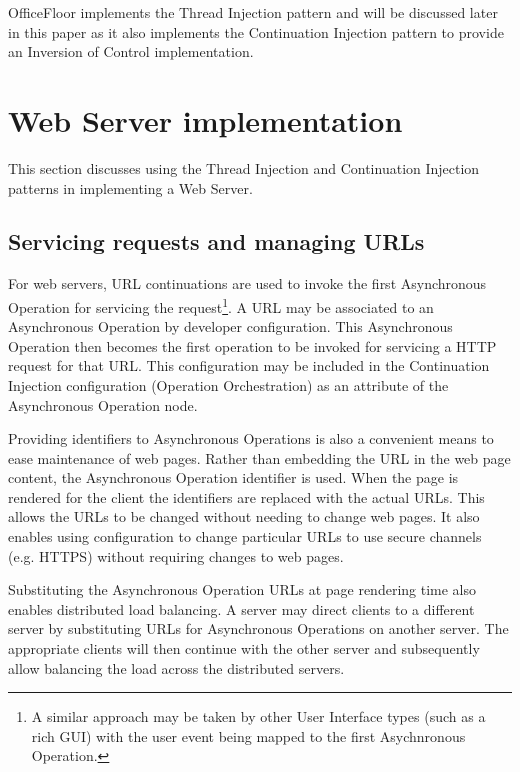 \documentclass[prodmode]{style/acmlarge}
\begin{document}
OfficeFloor \cite{officefloor} implements the Thread Injection pattern and will
be discussed later in this paper as it also implements the Continuation
Injection pattern to provide an Inversion of Control implementation.




\section{Web Server implementation}

This section discusses using the Thread Injection and Continuation Injection
patterns in implementing a Web Server.


\subsection{Servicing requests and managing URLs}

For web servers, URL continuations \cite{url-continuation} are used to invoke
the first Asynchronous Operation for servicing the request\footnote{A similar
approach may be taken by other User Interface types (such as a rich GUI) with
the user event being mapped to the first Asychnronous Operation.}.  A URL may be
associated to an Asynchronous Operation by developer configuration.  This
Asynchronous Operation then becomes the first operation to be invoked for
servicing a HTTP request for that URL.  This configuration may be included in
the Continuation Injection configuration (Operation Orchestration) as an
attribute of the Asynchronous Operation node.

Providing identifiers to Asynchronous Operations is also a convenient means to
ease maintenance of web pages.  Rather than embedding the URL in the web page
content, the Asynchronous Operation identifier is used.  When the page is
rendered for the client the identifiers are replaced with the actual URLs.
This allows the URLs to be changed without needing to change web pages.  It also
enables using configuration to change particular URLs to use secure channels (e.g.
HTTPS) without requiring changes to web pages.

Substituting the Asynchronous Operation URLs at page rendering time also enables
distributed load balancing.  A server may direct clients to a different server
by substituting URLs for Asynchronous Operations on another server. The
appropriate clients will then continue with the other server and subsequently
allow balancing the load across the distributed servers.
\end{document}
